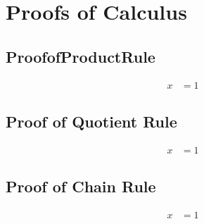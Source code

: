 \chapter{Proofs of Calculus}
\section{ProofofProductRule}
\label{sec:ProofOfProductRule}
\begin{align} 
  \label{eq:ProofOfProductRule}
  x & = 1
\end{align}
\newpage
\section{Proof of Quotient Rule}
\label{sec:ProofOfQuotientRule}
\begin{align}
  \label{eq:ProofOfQuotientRule}
  x & = 1
\end{align}
\newpage
\section{Proof of Chain Rule}
\label{sec:ProofOfChainRule}
\begin{align}
  \label{eq:ProofOfChainRule}
  x & = 1
\end{align}